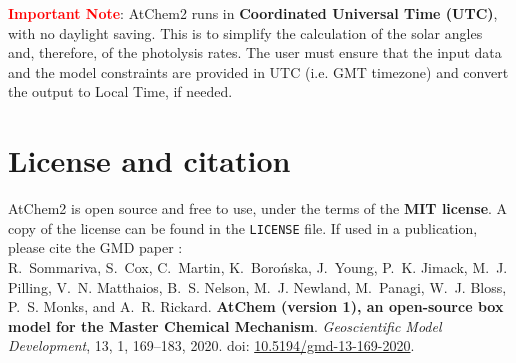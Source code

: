 \textcolor{red}{\bf Important Note}: AtChem2 runs in
\textbf{Coordinated Universal Time (UTC)}, with no daylight
saving. This is to simplify the calculation of the solar angles and,
therefore, of the photolysis rates. The user must ensure that the
input data and the model constraints are provided in UTC (i.e. GMT
timezone) and convert the output to Local Time, if needed.

\section{License and citation} \label{sec:license-citation}

AtChem2 is open source and free to use, under the terms of the
\textbf{MIT license}. A copy of the license can be found in the
\texttt{LICENSE} file. If used in a publication, please cite the GMD
paper \citep{sommariva_2020}:\\

R.~Sommariva, S.~Cox, C.~Martin, K.~Boro{\'n}ska, J.~Young, P.~K. Jimack,
M.~J. Pilling, V.~N. Matthaios, B.~S. Nelson, M.~J. Newland, M.~Panagi,
W.~J. Bloss, P.~S. Monks, and A.~R. Rickard.
\textbf{AtChem (version 1), an open-source box model for the Master Chemical Mechanism}.
\textit{Geoscientific Model Development}, 13, 1, 169--183, 2020.
doi: \href{https://doi.org/10.5194/gmd-13-169-2020}{10.5194/gmd-13-169-2020}.
